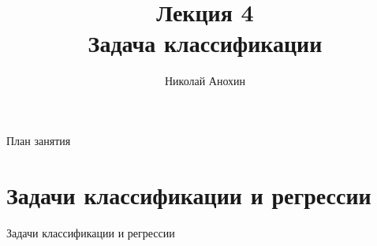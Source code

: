 \documentclass[10pt]{beamer}
\author{Николай Анохин}
\title{\newline \newline \newline Лекция 4 \\ Задача классификации}
\let\otp\titlepage
\renewcommand{\titlepage}{\otp\addtocounter{framenumber}{-1}}
\begin{document}
\begin{frame}[plain]
\titlepage
\end{frame}

\begin{frame}{План занятия}
\tableofcontents
\end{frame}

\section{Задачи классификации и регрессии}

\begin{frame}{}

\begin{center}
\Large Задачи классификации и регрессии
\end{center}

\end{frame}
\end{document}

